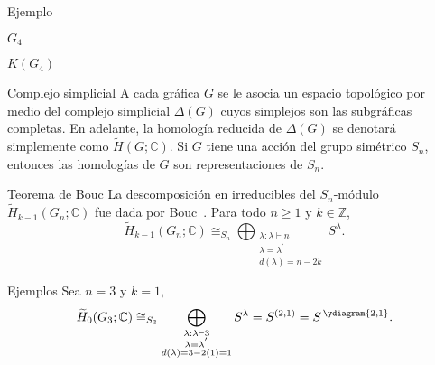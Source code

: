 \documentclass[final,xcolor=svgnames]{beamer}
\begin{document}
\begin{frame}{}
\begin{columns}
\begin{column}{0.5\textwidth}
\begin{block}{Ejemplo}
\begin{minipage}{0.3\linewidth}
            $G_{4}$
          \end{minipage}
        \begin{minipage}{0.3\linewidth}    
          \centering

            $K(G_{4})$
                  \end{minipage}
      \end{block}

      \begin{block}{Complejo simplicial}
        A cada gráfica $G$ se le asocia un espacio topológico por
        medio del complejo simplicial $\Delta(G)$ cuyos simplejos son
        las subgráficas completas. En adelante, la homología reducida
        de $\Delta(G)$ se denotará simplemente como $\widetilde
        H(G;\mathbb{C})$. Si $G$ tiene una acción del grupo simétrico
        $S_{n}$, entonces las homologías de $G$ son representaciones
        de $S_{n}$.
      \end{block}

      \begin{block}{Teorema de Bouc}
        La descomposición en irreducibles del $S_{n}$-módulo
        $\widetilde H_{k-1}(G_{n};\mathbb{C})$ fue dada por Bouc~\cite{MR756517}. Para
        todo $n\geq1$ y $k\in \mathbb{Z}$,
          \begin{equation*}
            \widetilde H_{k-1}(G_{n};\mathbb{C})\cong_{S_{n}}\bigoplus_{\substack{\lambda:\lambda\vdash n\\
              \lambda=\lambda^{'}\\d(\lambda)=n-2k}} S^{\lambda}.
          \end{equation*}
       \end{block}
       
        \begin{block}{Ejemplos} 
          Sea $n=3$ y $k=1$,
          \begin{equation*}
            \widetilde H_{0}(G_{3};\mathbb{C})\cong_{S_{3}}\bigoplus_{\substack{\lambda:\lambda\vdash 3\\
                \lambda=\lambda^{'}\\d(\lambda)=3-2(1)=1}} S^{\lambda}=S^{(2,1)}=S^{\,\ydiagram{2,1}}.
          \end{equation*}
          

\end{block}
\end{column}
\end{columns}
\end{frame}
\end{document}
